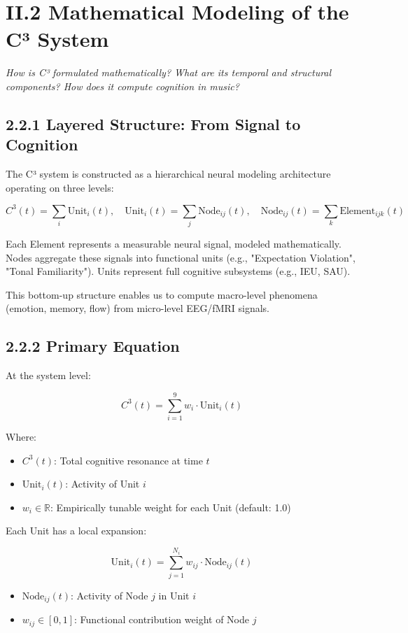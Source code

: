 \documentclass[10pt]{article}
\begin{document}
\section*{II.2 Mathematical Modeling of the C³ System}

\textit{How is C³ formulated mathematically? What are its temporal and structural components? How does it compute cognition in music?}

\subsection*{2.2.1 Layered Structure: From Signal to Cognition}

The C³ system is constructed as a hierarchical neural modeling architecture operating on three levels:

\[
C^3(t) = \sum_i \text{Unit}_i(t), \quad \text{Unit}_i(t) = \sum_j \text{Node}_{ij}(t), \quad \text{Node}_{ij}(t) = \sum_k \text{Element}_{ijk}(t)
\]

Each Element represents a measurable neural signal, modeled mathematically. Nodes aggregate these signals into functional units (e.g., "Expectation Violation", "Tonal Familiarity"). Units represent full cognitive subsystems (e.g., IEU, SAU).

This bottom-up structure enables us to compute macro-level phenomena (emotion, memory, flow) from micro-level EEG/fMRI signals.

\subsection*{2.2.2 Primary Equation}

At the system level:

\[
C^3(t) = \sum_{i=1}^{9} w_i \cdot \text{Unit}_i(t)
\]

Where:

\begin{itemize}
    \item $C^3(t)$: Total cognitive resonance at time $t$
    \item $\text{Unit}_i(t)$: Activity of Unit $i$
    \item $w_i \in \mathbb{R}$: Empirically tunable weight for each Unit (default: 1.0)
\end{itemize}

Each Unit has a local expansion:

\[
\text{Unit}_i(t) = \sum_{j=1}^{N_i} w_{ij} \cdot \text{Node}_{ij}(t)
\]

\begin{itemize}
    \item $\text{Node}_{ij}(t)$: Activity of Node $j$ in Unit $i$
    \item $w_{ij} \in [0,1]$: Functional contribution weight of Node $j$
\end{itemize}
\end{document}
